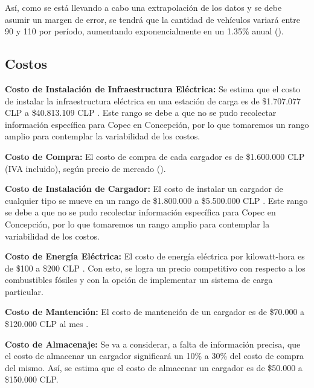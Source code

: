 \documentclass[letterpaper]{article}
\begin{document}
\begin{flushleft}
	Así, como se está llevando a cabo una extrapolación de los datos y se debe asumir un margen de error, se tendrá que la cantidad de vehículos variará entre 90 y 110 por período, aumentando exponencialmente en un 1.35\% anual (\cite{incremento-autos}).

	\subsection{Costos}

	\textbf{Costo de Instalación de Infraestructura Eléctrica:} Se estima que el costo de instalar la infraestructura eléctrica en una estación de carga es de \$1.707.077 CLP a \$40.813.109 CLP \cite{infraestructura}. Este rango se debe a que no se pudo recolectar información específica para Copec en Concepción, por lo que tomaremos un rango amplio para contemplar la variabilidad de los costos.

	\textbf{Costo de Compra:} El costo de compra de cada cargador es de \$1.600.000 CLP (IVA incluido), según precio de mercado (\cite{charge-cost}). 

	\textbf{Costo de Instalación de Cargador:} El costo de instalar un cargador de cualquier tipo se mueve en un rango de \$1.800.000 a \$5.500.000 CLP \cite{infraestructura}. Este rango se debe a que no se pudo recolectar información específica para Copec en Concepción, por lo que tomaremos un rango amplio para contemplar la variabilidad de los costos.
	
	\textbf{Costo de Energía Eléctrica:} El costo de energía eléctrica por kilowatt-hora es de \$100 a \$200 CLP \cite{kwh}. Con esto, se logra un precio competitivo con respecto a los combustibles fósiles y con la opción de implementar un sistema de carga particular.

	\textbf{Costo de Mantención:} El costo de mantención de un cargador es de \$70.000 a \$120.000 CLP al mes \cite{mantencion}. 

	\textbf{Costo de Almacenaje:} Se va a considerar, a falta de información precisa, que el costo de almacenar un cargador significará un 10\% a 30\% del costo de compra del mismo. Así, se estima que el costo de almacenar un cargador es de \$50.000 a \$150.000 CLP.

\end{flushleft}
\end{document}
